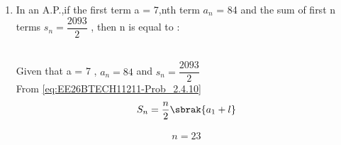 \begin{enumerate}[label=\thesubsection.\arabic*, ref=\thesubsection.\theenumi]
\item
In an A.P.,if the first term a = 7,nth term $a_n$ = 84 and the sum of first n terms $s_n = \dfrac{2093}{2}$ , then n is equal to :
\begin{enumerate}
\end{enumerate} 

\solution
\\Given that a = 7 , $a_n = 84$ and $s_n = \dfrac{2093}{2}$
\\From \eqref{eq:EE26BTECH11211-Prob_2.4.10} 
\begin{align}
S_n = \frac{n}{2}\sbrak{a_1 + l}
\end{align}

\begin{align}
n = 23
\end{align}


\end{enumerate}
